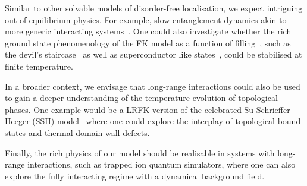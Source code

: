 Similar to other solvable models of disorder-free localisation, we expect intriguing out-of equilibrium physics. For example, slow entanglement dynamics akin to more generic interacting systems~\autocite{hartLogarithmicEntanglementGrowth2021}. One could also investigate whether the rich ground state phenomenology of the FK model as a function of filling~\autocite{gruberGroundStatesSpinless1990}, such as the devil's staircase~\autocite{michelettiCompleteDevilStaircase1997} as well as superconductor like states~\autocite{caiVisualizingEvolutionMott2016}, could be stabilised at finite temperature.

In a broader context, we envisage that long-range interactions could also be used to gain a deeper understanding of the temperature evolution of topological phases. One example would be a LRFK version of the celebrated Su-Schrieffer-Heeger (SSH) model~\autocite{batraPhysicsCoffeeDoughnuts2020,suSolitonsPolyacetylene1979} where one could explore the interplay of topological bound states and thermal domain wall defects.

Finally, the rich physics of our model should be realisable in systems with long-range interactions, such as trapped ion quantum simulators, where one can also explore the fully interacting regime with a dynamical background field.
